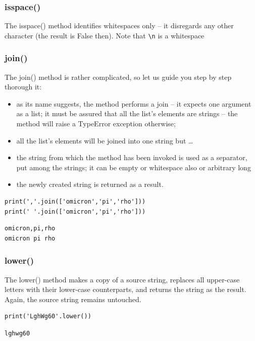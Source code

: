 \documentclass[11pt]{article}
\begin{document}
\subsubsection{isspace()}
\label{sec:org8ef383c}
The isspace() method identifies whitespaces only – it disregards any
other character (the result is False then). Note that \texttt{\textbackslash{}n} is a whitespace
\subsubsection{join()}
\label{sec:org7a37938}
The join() method is rather complicated, so let us guide you step by
step thorough it:
\begin{itemize}
\item as its name suggests, the method performs a join – it expects one
argument as a list; it must be assured that all the list’s elements
are strings – the method will raise a TypeError exception otherwise;
\item all the list’s elements will be joined into one string but \ldots{}
\item the string from which the method has been invoked is used as a
separator, put among the strings; it can be empty or whitespace also
or arbitrary long
\item the newly created string is returned as a result.
\end{itemize}

\begin{verbatim}
print(','.join(['omicron','pi','rho']))
print(' '.join(['omicron','pi','rho']))
\end{verbatim}

\begin{verbatim}
omicron,pi,rho
omicron pi rho
\end{verbatim}

\subsubsection{lower()}
\label{sec:orgb99335a}
The lower() method makes a copy of a source string, replaces all
upper-case letters with their lower-case counterparts, and returns the
string as the result. Again, the source string remains untouched.

\begin{verbatim}
print('LghWg60'.lower())
\end{verbatim}

\begin{verbatim}
lghwg60
\end{verbatim}
\end{document}
